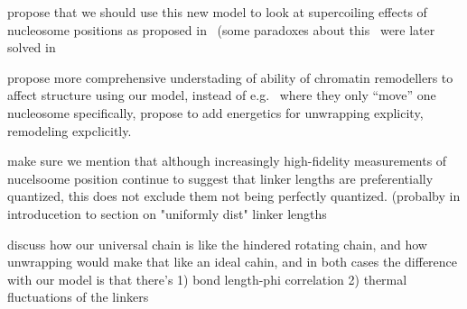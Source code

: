 \documentclass[%
 reprint,
superscriptaddress,
showpacs,preprintnumbers,
 amsmath,amssymb,
 aps,
 prl,
]{revtex4-1}
\begin{document}
propose that we should use this new model to look at supercoiling effects
of nucleosome positions as proposed in~\cite{grigoryev1981} (some paradoxes
about this~\cite{prunell1998} were later solved in~\cite{nikitina2017}

propose more comprehensive understading of ability of chromatin
remodellers to affect structure using our model, instead of
e.g.~\cite{muller2014} where they only ``move'' one nucleosome
specifically, propose to add energetics for unwrapping explicity, remodeling
expclicitly.

make sure we mention that although increasingly high-fidelity measurements
of nucelsoome position continue to suggest that linker lengths are
preferentially quantized, this does not exclude them not being perfectly
quantized. (probalby in introducetion to section on "uniformly dist" linker
lengths

discuss how our universal chain is like the hindered rotating chain, and
how unwrapping would make that like an ideal cahin, and in both cases the
difference with our model is that there's 1) bond length-phi correlation 2)
thermal fluctuations of the linkers




\end{document}
